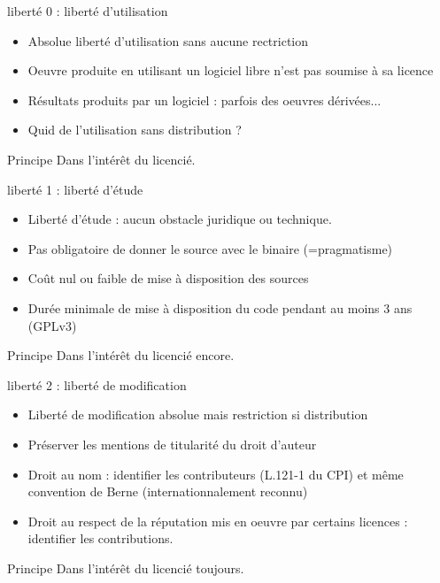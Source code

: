 \documentclass{beamer}
\begin{document}


\begin{frame}{liberté 0 : liberté d'utilisation}
  \begin{itemize}
  \item Absolue liberté d'utilisation sans aucune rectriction
  \item Oeuvre produite en utilisant un logiciel libre n'est pas soumise à sa licence
  \item Résultats produits par un logiciel : parfois des oeuvres dérivées...
  \item Quid de l'utilisation sans distribution ?
  \end{itemize}

  \begin{alertblock}{Principe}
    Dans l'intérêt du licencié.
  \end{alertblock}

\end{frame}


\begin{frame}{liberté 1 : liberté d'étude}
  \begin{itemize}
  \item Liberté d'étude : aucun obstacle juridique ou technique.
  \item Pas obligatoire de donner le source avec le binaire (=pragmatisme)
  \item Coût nul ou faible de mise à disposition des sources
  \item Durée minimale de mise à disposition du code pendant au moins 3 ans (GPLv3)
  \end{itemize}
  \begin{alertblock}{Principe}
    Dans l'intérêt du licencié encore.
  \end{alertblock}
\end{frame}


\begin{frame}{liberté 2 : liberté de modification}
  \begin{itemize}
  \item Liberté de modification absolue mais restriction si distribution
  \item Préserver les mentions de titularité du droit d'auteur
  \item Droit au nom : identifier les contributeurs (L.121-1 du CPI) et même convention de Berne (internationnalement reconnu)
  \item Droit au respect de la réputation mis en oeuvre par certains licences : identifier les contributions.
  \end{itemize}
\begin{alertblock}{Principe}
    Dans l'intérêt du licencié toujours.
  \end{alertblock}
\end{frame}
\end{document}
